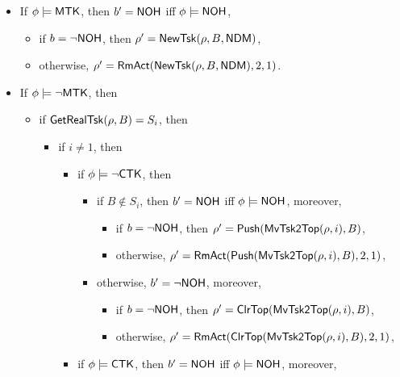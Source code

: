 {\begin{itemize}
    \item If $\phi \models {\sf MTK}$, then $b' = {\sf NOH}$ iff $\phi  \models {\sf NOH}$, 
    \begin{itemize}
    	\item if $b = \neg {\sf NOH}$, then $\rho'=\mathsf{NewTsk}(\rho, B, {\sf NDM})$, 
	\item otherwise, $\rho'= \mathsf{RmAct}(\mathsf{NewTsk}(\rho, B, {\sf NDM}), 2, 1)$.
    \end{itemize}
    \item If $\phi \models \neg {\sf MTK}$, then
   \begin{itemize}
        \item if $\mathsf{GetRealTsk}(\rho, B) = S_i$, then
	\begin{itemize}
		\item if $i \neq 1$, then
        			\begin{itemize}
            			\item if $\phi \models \neg {\sf CTK}$, then 
				\begin{itemize}
					\item if $B \not \in S_i$, then $b' = {\sf NOH}$ iff $\phi  \models {\sf NOH}$, moreover, 
					\begin{itemize}
						\item if $b = \neg {\sf NOH}$, then $\rho' = \mathsf{Push}(\mathsf{MvTsk2Top}(\rho, i), B)$, 
						\item otherwise, $\rho' = \mathsf{RmAct}(\mathsf{Push}(\mathsf{MvTsk2Top}(\rho, i), B), 2, 1)$, 
					\end{itemize}
					\item otherwise, $b' = \neg {\sf NOH}$,
					moreover, 
					\begin{itemize}
						\item if $b = \neg {\sf NOH}$, then $\rho'=\mathsf{ClrTop}(\mathsf{MvTsk2Top}(\rho, i), B)$, 
						\item otherwise,  $\rho'= \mathsf{RmAct}(\mathsf{ClrTop}(\mathsf{MvTsk2Top}(\rho, i), B), 2, 1)$, 
					\end{itemize}
				\end{itemize}
            			\item if $\phi \models {\sf CTK}$, then $b' = {\sf NOH}$ iff $\phi  \models {\sf NOH}$, moreover, 

\end{itemize}
\end{itemize}
\end{itemize}
\end{itemize}}
